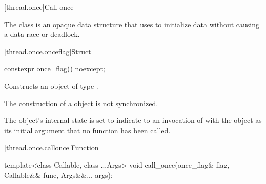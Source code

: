 [thread.once]{Call once}

The class  is an opaque data structure that  uses to
initialize data without causing a data race or deadlock.

[thread.once.onceflag]{Struct }

%
\begin{itemdecl}
constexpr once_flag() noexcept;
\end{itemdecl}

\begin{itemdescr}
\pnum\effects Constructs an object of type .

\pnum\sync The construction of a  object is not synchronized.

\pnum\postcondition The object's internal state is set to indicate to an invocation of
 with the object as its initial argument that no function has been
called.
\end{itemdescr}

[thread.once.callonce]{Function }

%
\begin{itemdecl}
template<class Callable, class ...Args>
  void call_once(once_flag& flag, Callable&& func, Args&&... args);
\end{itemdecl}

